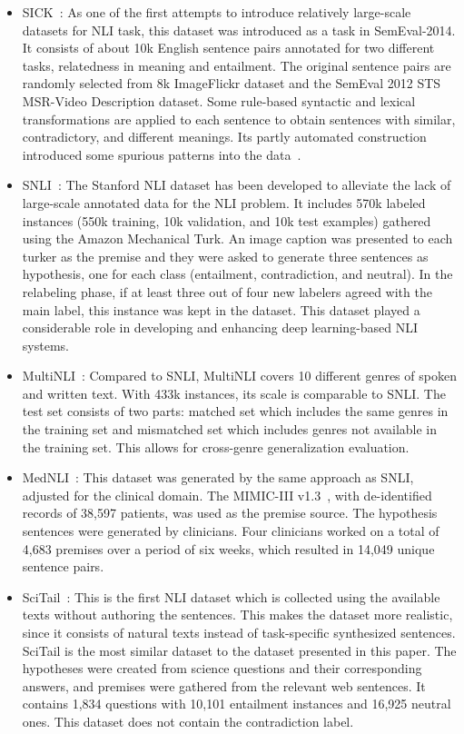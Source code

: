 \documentclass[preprint,12pt]{elsarticle}
\begin{document}
\begin{itemize}
    \item SICK~\citep{marelli2014semeval}: As one of the first attempts to introduce relatively large-scale datasets for NLI task, this dataset was introduced as a task in SemEval-2014. It consists of about 10k English sentence pairs annotated for two different tasks, relatedness in meaning and entailment. The original sentence pairs are randomly selected from 8k ImageFlickr dataset and the SemEval 2012 STS MSR-Video Description dataset. Some rule-based syntactic and lexical transformations are applied to each sentence to obtain sentences with similar, contradictory, and different meanings. Its partly automated construction introduced some spurious patterns into the data~\citep{bowman2015large}. 
    \item SNLI~\citep{bowman2015large}: The Stanford NLI dataset has been developed to alleviate the lack of large-scale annotated data for the NLI problem. It includes 570k labeled instances (550k training, 10k validation, and 10k test examples) gathered using the Amazon Mechanical Turk. An image caption was presented to each turker as the premise and they were asked to generate three sentences as hypothesis, one for each class (entailment, contradiction, and neutral). In the relabeling phase, if at least three out of four new labelers agreed with the main label, this instance was kept in the dataset. This dataset played a considerable role in developing and enhancing deep learning-based NLI systems.  
    \item MultiNLI~\citep{williams2017broad}: Compared to SNLI, MultiNLI covers 10 different genres of spoken and written text. With 433k instances, its scale is comparable to SNLI. The test set consists of two parts: matched set which includes the same genres in the training set and mismatched set which includes genres not available in the training set. This allows for cross-genre generalization evaluation. 
    \item MedNLI~\citep{romanov2018lessons}: This dataset was generated by the same approach as SNLI, adjusted for the clinical domain. The MIMIC-III v1.3~\citep{johnson2016mimic}, with de-identified records of 38,597 patients, was used as the premise source. The hypothesis sentences were generated by clinicians. Four clinicians worked on a total of 4,683 premises over a period of six weeks, which resulted in 14,049 unique sentence pairs. 
    \item SciTail~\citep{khot2018scitail}: This is the first NLI dataset which is collected using the available texts without authoring the sentences. This makes the dataset more realistic, since it consists of natural texts instead of task-specific synthesized sentences. SciTail is the most similar dataset to the dataset presented in this paper. The hypotheses were created from science questions and their corresponding answers, and premises were gathered from the relevant web sentences. It contains 1,834 questions with 10,101 entailment instances and 16,925 neutral ones. This dataset does not contain the contradiction label. 

\end{itemize}
\end{document}
